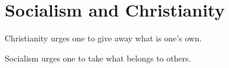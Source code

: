 \section{Socialism and Christianity}

\begin{quotex}
Christianity urges one to give away what is one's own.

Socialism urges one to take what belongs to others.
\end{quotex}


